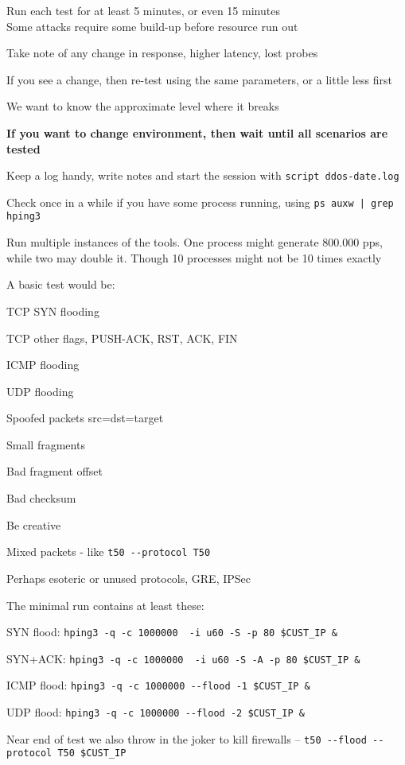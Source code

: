 \documentclass[Screen16to9,17pt]{foils}
\begin{document}

\begin{list2}
\item Run each test for at least 5 minutes, or even 15 minutes\\
Some attacks require some build-up before resource run out
\item Take note of any change in response, higher latency, lost probes
\item If you see a change, then re-test using the same parameters, or a little less first
\item We want to know the approximate level where it breaks
\item {\bf If you want to change environment, then wait until all scenarios are tested}
\item Keep a log handy, write notes and start the session with \verb+script ddos-date.log+
\item Check once in a while if you have some process running, using \verb+ps auxw | grep hping3+
\item Run multiple instances of the tools. One process might generate 800.000 pps, while two may double it. Though 10 processes might not be 10 times exactly
\end{list2}




A basic test would be:
\begin{list2}
\item TCP SYN flooding
\item TCP other flags, PUSH-ACK, RST, ACK, FIN
\item ICMP flooding
\item UDP flooding
\item Spoofed packets src=dst=target \smiley
\item Small fragments
\item Bad fragment offset
\item Bad checksum
\item Be creative
\item Mixed packets - like \verb+t50 --protocol T50+
\item Perhaps esoteric or unused protocols, GRE, IPSec
\end{list2}


The minimal run contains at least these:
\begin{list2}
\item SYN flood: \verb+hping3 -q -c 1000000  -i u60 -S -p 80 $CUST_IP &+
\item SYN+ACK: \verb+hping3 -q -c 1000000  -i u60 -S -A -p 80 $CUST_IP &+
\item ICMP flood: \verb+hping3 -q -c 1000000 --flood -1 $CUST_IP &+
\item UDP flood: \verb+hping3 -q -c 1000000 --flood -2 $CUST_IP &+
\item Near end of test we also throw in the joker to kill firewalls -- \verb+t50 --flood --protocol T50 $CUST_IP+
\end{list2}
\end{document}
